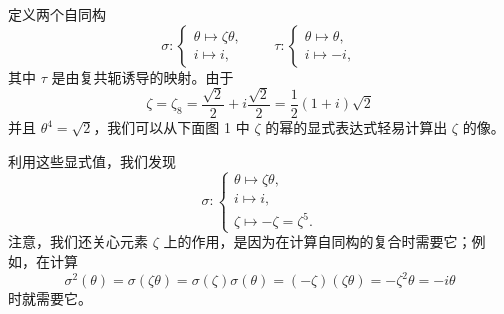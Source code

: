 定义两个自同构
\[
\sigma:\begin{cases}
\theta\longmapsto \zeta\theta,\\
i\longmapsto i,
\end{cases}
\qquad
\tau:\begin{cases}
\theta\longmapsto \theta,\\
i\longmapsto -i,
\end{cases}
\]
其中 $\tau$ 是由复共轭诱导的映射。由于
\[
\zeta=\zeta_8=\frac{\sqrt2}{2}+i\frac{\sqrt2}{2}=\frac12(1+i)\sqrt2
\]
并且 $\theta^4=\sqrt2$，我们可以从下面图 1 中 $\zeta$ 的幂的显式表达式轻易计算出 $\zeta$ 的像。

\begin{center}
\end{center}

利用这些显式值，我们发现
\[
\sigma:\begin{cases}
\theta\longmapsto \zeta\theta,\\
i\longmapsto i,\\
\zeta\longmapsto -\zeta=\zeta^5.
\end{cases}
\]
注意，我们还关心元素 $\zeta$ 上的作用，是因为在计算自同构的复合时需要它；例如，在计算
\[
\sigma^2(\theta)=\sigma(\zeta\theta)=\sigma(\zeta)\sigma(\theta)=(-\zeta)(\zeta\theta)=-\zeta^2\theta=-i\theta
\]
时就需要它。

